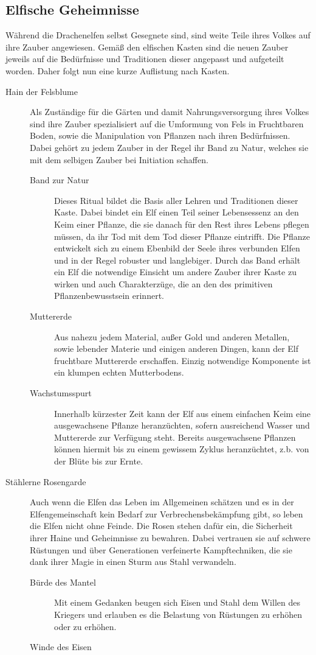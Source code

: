 \documentclass[a4paper,12pt,oneside]{book}
\begin{document}
\subsection{Elfische Geheimnisse}\label{Elfische Geheimnisse}
Während die Drachenelfen selbst Gesegnete sind, sind weite Teile ihres Volkes auf ihre Zauber angewiesen. Gemäß den elfischen Kasten sind die neuen Zauber jeweils auf die Bedürfnisse und Traditionen dieser angepasst und aufgeteilt worden. Daher folgt nun eine kurze Auflistung nach Kasten.
\begin{description}
\item[Hain der Felsblume]
Als Zuständige für die Gärten und damit Nahrungsversorgung ihres Volkes sind ihre Zauber spezialisiert auf die Umformung von Fels in Fruchtbaren Boden, sowie die Manipulation von Pflanzen nach ihren Bedürfnissen. Dabei gehört zu jedem Zauber in der Regel ihr Band zu Natur, welches sie mit dem selbigen Zauber bei Initiation schaffen.
\begin{description}
\item[Band zur Natur]Dieses Ritual bildet die Basis aller Lehren und Traditionen dieser Kaste. Dabei bindet ein Elf einen Teil seiner Lebensessenz an den Keim einer Pflanze, die sie danach für den Rest ihres Lebens pflegen müssen, da ihr Tod mit dem Tod dieser Pflanze eintrifft. Die Pflanze entwickelt sich zu einem Ebenbild der Seele ihres verbunden Elfen und in der Regel robuster und langlebiger. Durch das Band erhält ein Elf die notwendige Einsicht um andere Zauber ihrer Kaste zu wirken und auch Charakterzüge, die an den des primitiven Pflanzenbewusstsein erinnert.
\item[Muttererde]Aus nahezu jedem Material, außer Gold und anderen Metallen, sowie lebender Materie und einigen anderen Dingen, kann der Elf fruchtbare Muttererde erschaffen. Einzig notwendige Komponente ist ein klumpen echten Mutterbodens.
\item[Wachstumsspurt]Innerhalb kürzester Zeit kann der Elf aus einem einfachen Keim eine ausgewachsene Pflanze heranzüchten, sofern ausreichend Wasser und Muttererde zur Verfügung steht. Bereits ausgewachsene Pflanzen können hiermit bis zu einem gewissem Zyklus heranzüchtet, z.b. von der Blüte bis zur Ernte.
\end{description}
\item[Stählerne Rosengarde]
Auch wenn die Elfen das Leben im Allgemeinen schätzen und es in der Elfengemeinschaft kein Bedarf zur Verbrechensbekämpfung gibt, so leben die Elfen nicht ohne Feinde. Die Rosen stehen dafür ein, die Sicherheit ihrer Haine und Geheimnisse zu bewahren. Dabei vertrauen sie auf schwere Rüstungen und über Generationen verfeinerte Kampftechniken, die sie dank ihrer Magie in einen Sturm aus Stahl verwandeln.
\begin{description}
\item[Bürde des Mantel]Mit einem Gedanken beugen sich Eisen und Stahl dem Willen des Kriegers und erlauben es die Belastung von Rüstungen zu erhöhen oder zu erhöhen.
\item[Winde des Eisen]
\end{description}
\end{description}
\end{document}
